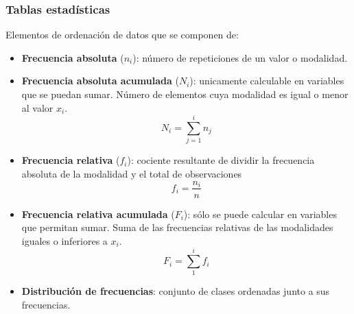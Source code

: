 \subsubsection{Tablas estadísticas}
Elementos de ordenación de datos que se componen de:
\begin{itemize}[itemsep=0pt,parsep=0pt,topsep=0pt,partopsep=0pt]
    \item \textbf{Frecuencia absoluta} ($n_i$): número de repeticiones de un valor o modalidad.
    \item\textbf{Frecuencia absoluta acumulada} ($N_i$): unicamente calculable en variables que se puedan sumar. Número de elementos cuya modalidad es igual o menor al valor $x_i$.
        \[ N_i = \sum_{j=1}^{i}n_j \]
    \item\textbf{Frecuencia relativa} ($f_i$): cociente resultante de dividir la frecuencia absoluta de la modalidad y el total de observaciones
        \[ f_i = \dfrac{n_i}{n} \]
    \item\textbf{Frecuencia relativa acumulada} ($F_i$): sólo se puede calcular en variables que permitan sumar. Suma de las frecuencias relativas de las modalidades iguales o inferiores a $x_i$.
        \[ F_i = \sum_{1}^{i}f_i \]
    \item\textbf{Distribución de frecuencias}: conjunto de clases ordenadas junto a sus frecuencias.
\end{itemize}
